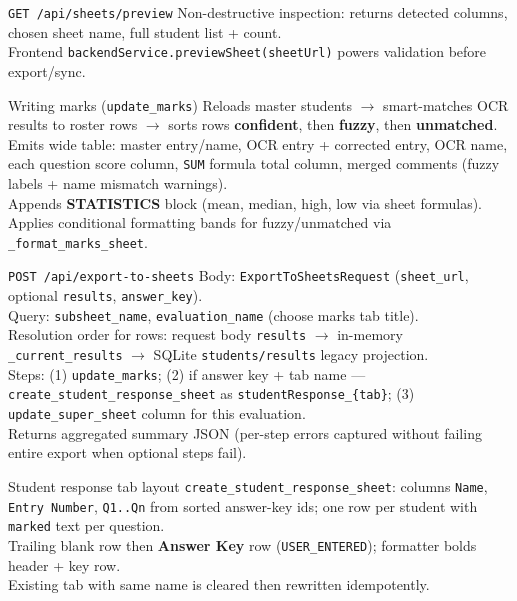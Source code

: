 \documentclass[aspectratio=169]{beamer}
\begin{document}
\begin{frame}[fragile]{\texttt{GET /api/sheets/preview}}
  \small
  Non-destructive inspection: returns detected columns, chosen sheet name, full student list + count.\\
  Frontend \texttt{backendService.previewSheet(sheetUrl)} powers validation before export/sync.
\end{frame}

\begin{frame}{Writing marks (\texttt{update\_marks})}
  \tiny
  Reloads master students $\rightarrow$ smart-matches OCR results to roster rows $\rightarrow$ sorts rows \textbf{confident}, then \textbf{fuzzy}, then \textbf{unmatched}.\\
  Emits wide table: master entry/name, OCR entry + corrected entry, OCR name, each question score column, \texttt{SUM} formula total column, merged comments (fuzzy labels + name mismatch warnings).\\
  Appends \textbf{STATISTICS} block (mean, median, high, low via sheet formulas).\\
  Applies conditional formatting bands for fuzzy/unmatched via \texttt{\_format\_marks\_sheet}.
\end{frame}

\begin{frame}[fragile]{\texttt{POST /api/export-to-sheets}}
  \small
  Body: \texttt{ExportToSheetsRequest} (\texttt{sheet\_url}, optional \texttt{results}, \texttt{answer\_key}).\\
  Query: \texttt{subsheet\_name}, \texttt{evaluation\_name} (choose marks tab title).\\
  Resolution order for rows: request body \texttt{results} $\rightarrow$ in-memory \texttt{\_current\_results} $\rightarrow$ SQLite \texttt{students/results} legacy projection.\\
  Steps: (1) \texttt{update\_marks}; (2) if answer key + tab name --- \texttt{create\_student\_response\_sheet} as \texttt{studentResponse\_\{tab\}}; (3) \texttt{update\_super\_sheet} column for this evaluation.\\
  Returns aggregated summary JSON (per-step errors captured without failing entire export when optional steps fail).
\end{frame}

\begin{frame}{Student response tab layout}
  \small
  \texttt{create\_student\_response\_sheet}: columns \texttt{Name}, \texttt{Entry Number}, \texttt{Q1..Qn} from sorted answer-key ids; one row per student with \texttt{marked} text per question.\\
  Trailing blank row then \textbf{Answer Key} row (\texttt{USER\_ENTERED}); formatter bolds header + key row.\\
  Existing tab with same name is cleared then rewritten idempotently.
\end{frame}
\end{document}
